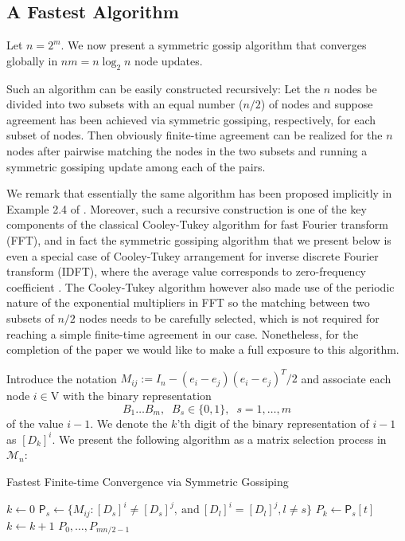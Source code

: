 \documentclass[a4paper, 11pt]{article}
\begin{document}
\subsection{A Fastest Algorithm} Let $n=2^m$. We now present  a symmetric gossip algorithm that converges globally in $nm=n\log_2 n$ node updates.
{ Such an algorithm can be easily constructed recursively: Let the $n$ nodes be  divided   into  two subsets with an equal number ($n/2$) of nodes and suppose agreement has been achieved via symmetric gossiping, respectively, for each subset of nodes. Then obviously finite-time agreement can be realized  for the $n$ nodes after  pairwise matching the nodes in the two subsets and running  a symmetric gossiping update among each of the pairs.


We remark that  essentially the same algorithm has  been proposed implicitly in Example 2.4 of \cite{FagnaniJSAC}. Moreover, such a  recursive construction is one of  the key components of
the classical  Cooley-Tukey  algorithm \cite{butterfly} for fast Fourier transform (FFT), and in fact the symmetric gossiping  algorithm that we present below  is even a special case of Cooley-Tukey arrangement for inverse discrete Fourier transform (IDFT), where the average value corresponds to  zero-frequency coefficient \cite{IDFT}. The  Cooley-Tukey  algorithm however also made use of the periodic nature of the exponential multipliers in FFT so the matching between two subsets of $n/2$ nodes needs to be carefully selected, which is not required  for reaching a simple finite-time agreement in our case. Nonetheless, for the completion of the paper we would like to make a full exposure to this algorithm.
}




Introduce the notation $M_{ij}:=I_n-{(e_i-e_j)(e_i-e_j)^T}/{2}$ and associate each node $i \in \mathrm{V}$ with the binary representation
$$
B_1\dots B_m,\;\;  B_s\in\{0,1\},\;\;  s=1,\dots,m
$$
of the value $i-1$. We denote the $k$'th digit of the binary representation of $i-1$ as $[D_k]^i$. We present the following algorithm as a matrix selection process in $ \mathscr{M}_n$:



\begin{algorithm}[htb]
\caption{Fastest Finite-time Convergence   via Symmetric Gossiping}
\label{alg:Framwork}
\begin{algorithmic}[1]
\STATE $k\gets 0$
    \STATE  $\mathsf{P}_s \gets \big\{M_{ij}: [D_s]^i \neq [D_s]^j,\ \mbox{and}\ [D_l]^i=[D_l]^j, l\neq s\big\}$
        \STATE $P_k \gets \mathsf{P}_s[t]$
        \STATE $k\gets k+1$
    \ENDFOR
\ENDFOR
\RETURN $P_0, \dots, P_{mn/2-1}$
\end{algorithmic}
\end{algorithm}
\end{document}
